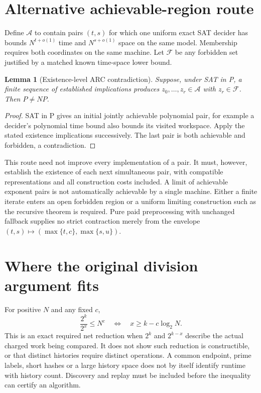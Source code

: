\documentclass[11pt]{article}
\newtheorem{lemma}{Lemma}
\begin{document}
\section{Alternative achievable-region route}
Define $\mathcal A$ to contain pairs $(t,s)$ for which one uniform exact
SAT decider has bounds $N^{t+o(1)}$ time and $N^{s+o(1)}$ space on the
same model. Membership requires both coordinates on the same machine.
Let $\mathcal F$ be any forbidden set justified by a matched known
time-space lower bound.

\begin{lemma}[Existence-level ARC contradiction]
Suppose, under SAT in P, a finite sequence of established implications
produces $z_0,\ldots,z_r\in\mathcal A$ with $z_r\in\mathcal F$. Then
$P\ne NP$.
\end{lemma}
\begin{proof}
SAT in P gives an initial jointly achievable polynomial pair, for example
a decider's polynomial time bound also bounds its visited workspace.
Apply the stated existence implications successively. The last pair is
both achievable and forbidden, a contradiction.
\end{proof}
This route need not improve every implementation of a pair. It must,
however, establish the existence of each next simultaneous pair, with
compatible representations and all construction costs included. A limit
of achievable exponent pairs is not automatically achievable by a single
machine. Either a finite iterate enters an open forbidden region or a
uniform limiting construction such as the recursive theorem is required.
Pure paid preprocessing with unchanged fallback supplies no strict
contraction merely from the envelope
$(t,s)\mapsto(\max\{t,c\},\max\{s,u\})$.

\section{Where the original division argument fits}
For positive $N$ and any fixed $c$,
\[
 \frac{2^k}{2^x}\le N^c
 \quad\Longleftrightarrow\quad x\ge k-c\log_2N.
\]
This is an exact required net reduction when $2^k$ and $2^{k-x}$ describe
the actual charged work being compared. It does not show such reduction
is constructible, or that distinct histories require distinct operations.
A common endpoint, prime labels, short hashes or a large history space
does not by itself identify runtime with history count. Discovery and
replay must be included before the inequality can certify an algorithm.
\end{document}
